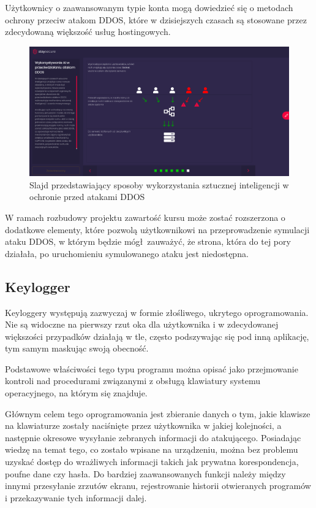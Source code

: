 \documentclass[12pt,twoside]{article}
\begin{document}
Użytkownicy o zaawansowanym typie konta mogą dowiedzieć się o metodach ochrony przeciw atakom DDOS, które w dzisiejszych czasach są stosowane przez zdecydowaną większość usług hostingowych. 

\begin{figure}[H]
	\centering
	\includegraphics[width=1\linewidth]{figures/dos-slide-screenshot3}
	\caption{Slajd przedstawiający sposoby wykorzystania sztucznej inteligencji w ochronie przed atakami DDOS}
\end{figure}


W ramach rozbudowy projektu zawartość kursu może zostać rozszerzona o dodatkowe elementy, które pozwolą użytkownikowi na przeprowadzenie symulacji ataku DDOS, w którym będzie mógł zauważyć, że strona, która do tej pory działała, po uruchomieniu symulowanego ataku jest niedostępna.
 
\clearpage


\subsection{Keylogger}

Keyloggery występują zazwyczaj w formie złośliwego, ukrytego oprogramowania. Nie są widoczne na pierwszy rzut oka dla użytkownika i w zdecydowanej większości przypadków działają w tle, często podszywając się pod inną aplikację, tym samym maskując swoją obecność. 

Podstawowe właściwości tego typu programu można opisać jako przejmowanie kontroli nad procedurami związanymi z obsługą klawiatury systemu operacyjnego, na którym się znajduje.

Głównym celem tego oprogramowania jest zbieranie danych o tym, jakie klawisze na klawiaturze zostały naciśnięte przez użytkownika w jakiej kolejności, a następnie okresowe wysyłanie zebranych informacji do atakującego. Posiadając wiedzę na temat tego, co zostało wpisane na urządzeniu, można bez problemu uzyskać dostęp do wrażliwych informacji takich jak prywatna korespondencja, poufne dane czy hasła. Do bardziej zaawansowanych funkcji należy między innymi przesyłanie zrzutów ekranu, rejestrowanie historii otwieranych programów i przekazywanie tych informacji dalej.
\end{document}
